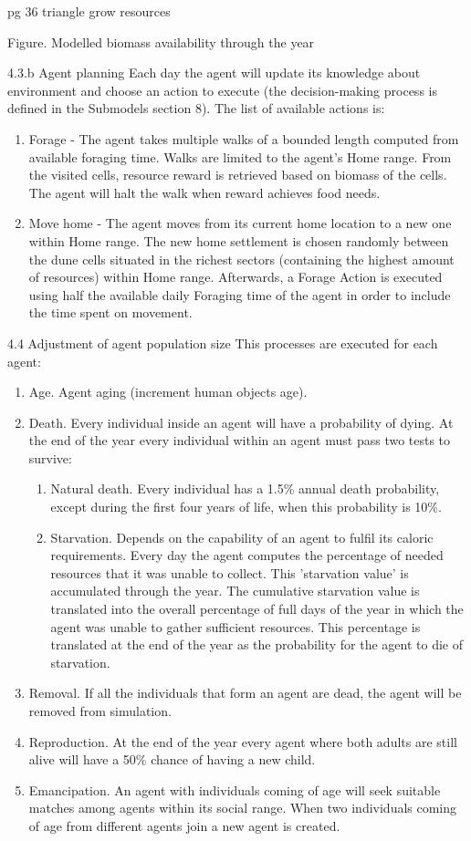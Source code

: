 pg 36 triangle grow resources

Figure. Modelled biomass availability through the year


4.3.b
Agent planning
Each day the agent will update its knowledge about environment and choose an action to execute (the
decision-making process is defined in the Submodels section 8). The list of available actions is:
\begin{enumerate}
\item Forage - The agent takes multiple walks of a bounded length computed from available
foraging time. Walks are limited to the agent’s Home range. From the visited cells, resource
reward is retrieved based on biomass of the cells. The agent will halt the walk when reward
achieves food needs.
\item Move home - The agent moves from its current home location to a new one within Home
range. The new home settlement is chosen randomly between the dune cells situated in the
richest sectors (containing the highest amount of resources) within Home range. Afterwards, a
Forage Action is executed using half the available daily Foraging time of the agent in order to
include the time spent on movement.
\end{enumerate}

4.4 Adjustment of agent population size
This processes are executed for each agent:

\begin{enumerate}[1-]
	\item Age. Agent aging (increment human objects age).
	\item Death. Every individual inside an agent will have a probability of dying. At the end of the year
	every individual within an agent must pass two tests to survive:
	\begin{enumerate}
		\item Natural death. Every individual has a 1.5\% annual death probability, except during the
		first four years of life, when this probability is 10\%.
		\item Starvation. Depends on the capability of an agent to fulfil its caloric requirements. Every
		day the agent computes the percentage of needed resources that it was unable to collect.
		This 'starvation value' is accumulated through the year. The cumulative starvation value is
		translated into the overall percentage of full days of the year in which the agent was
		unable to gather sufficient resources. This percentage is translated at the end of the year
		as the probability for the agent to die of starvation.
	\end{enumerate}
	\item Removal. If all the individuals that form an agent are dead, the agent will be removed from
	simulation.
	\item Reproduction. At the end of the year every agent where both adults are still alive will have a
	50\% chance of having a new child.
	\item Emancipation. An agent with individuals coming of age will seek suitable matches among
	agents within its social range. When two individuals coming of age from different agents join a
	new agent is created.
\end{enumerate}

